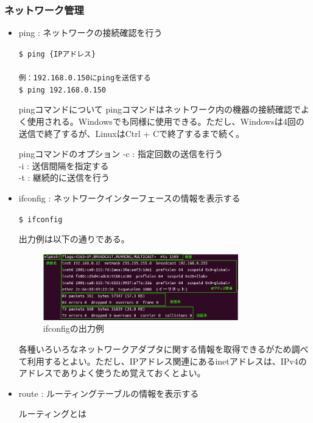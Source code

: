 \documentclass[a4paper, 11pt, dvipdfmx]{jsarticle}
\begin{document}
\subsubsection{ネットワーク管理}
\begin{itemize}
  \item ping : ネットワークの接続確認を行う
  \begin{terminalbox}
    \verb|$ ping {IPアドレス}|\\\\
    \verb|例：192.168.0.150にpingを送信する|\\
    \verb|$ ping 192.168.0.150|
  \end{terminalbox}
  \begin{hosokubox}{pingコマンドについて}
    pingコマンドはネットワーク内の機器の接続確認でよく使用される。Windowsでも同様に使用できる。ただし、Windowsは4回の送信で終了するが、LinuxはCtrl + Cで終了するまで続く。
  \end{hosokubox}
  \begin{hosokubox}{pingコマンドのオプション}
    -c : 指定回数の送信を行う\\
    -i : 送信間隔を指定する\\
    -t : 継続的に送信を行う
  \end{hosokubox}
  \item ifconfig : ネットワークインターフェースの情報を表示する
  \begin{terminalbox}
    \verb|$ ifconfig|
  \end{terminalbox}
  出力例は以下の通りである。
  \begin{figure}[H]
    \centering
    \includegraphics[width=0.8\textwidth]{images/linux-server/4_1_4-1-ifconfig.png}
    \caption{ifconfigの出力例}
    \label{fig:your_image}
  \end{figure}
  各種いろいろなネットワークアダプタに関する情報を取得できるがため調べて利用するとよい。ただし、IPアドレス関連にあるinetアドレスは、IPv4のアドレスでありよく使うため覚えておくとよい。
  \item route : ルーティングテーブルの情報を表示する
  \begin{johobox}{ルーティングとは}

\end{johobox}
\end{itemize}
\end{document}
